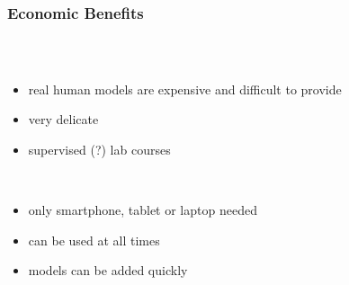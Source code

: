 \begin{frame}
  \frametitle{Economic Benefits}
  \begin{columns}
    \begin{column}{0.8\textwidth}
      \begin{description}[]
        \item[Costs of ordinary teaching] \hfill \\
        \begin{itemize}
          \item real human models are expensive and difficult to provide
          \item very delicate
          \item supervised (?) lab courses
        \end{itemize}

        \bigskip
        \item[Costs using our application] \hfill \\
          \begin{itemize}
            \item only smartphone, tablet or laptop needed
            \item can be used at all times
            \item models can be added quickly
        \end{itemize}
      \end{description}
    \end{column}


\end{columns}
\end{frame}
